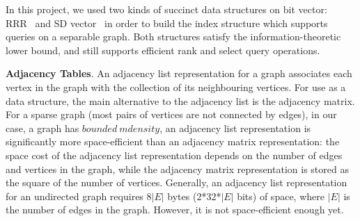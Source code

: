 \documentclass[12pt,glossary]{dalthesis}
\begin{document}
\bigskip

In this project, we used two kinds of succinct data structures on bit vector: RRR~\cite{RRR} and SD vector~\cite{SD-vector} in order to build the index structure which supports queries on a separable graph. Both structures satisfy the information-theoretic lower bound, and still supports efficient rank and select query operations.

\bigskip
\bigskip

\textbf{Adjacency Tables}. An adjacency list representation for a graph associates each vertex in the graph with the collection of its neighbouring vertices. For use as a data structure, the main alternative to the adjacency list is the adjacency matrix. For a sparse graph (most pairs of vertices are not connected by edges), in our case, a graph has $bounded \ mdensity$, an adjacency list representation is significantly more space-efficient than an adjacency matrix representation: the space cost of the adjacency list representation depends on the number of edges and vertices in the graph, while the adjacency matrix representation is stored as the square of the number of vertices. Generally, an adjacency list representation for an undirected graph requires 8$|E|$ bytes (2*32*$|E|$ bits) of space, where $|E|$ is the number of edges in the graph. However, it is not space-efficient enough yet.

\bigskip
\bigskip
\end{document}
